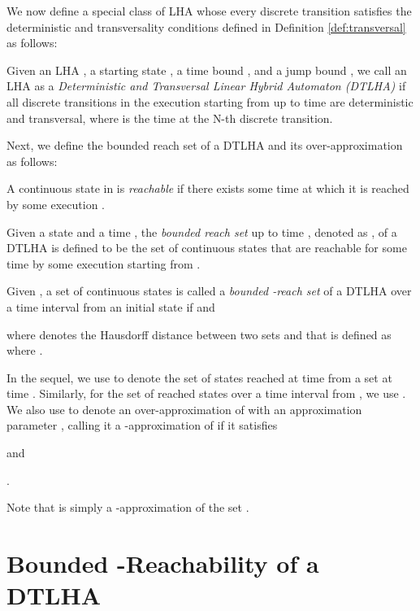 We now define a special class of LHA whose every discrete transition satisfies the deterministic and transversality conditions defined in Definition \ref{def:transversal} as follows:

\begin{defn} \label{pre:def:dtlha}
Given an LHA , a starting state , a time bound , and a jump bound , we call an LHA  as a \emph{Deterministic and Transversal Linear Hybrid Automaton (DTLHA)}  if all discrete transitions in the execution starting from  up to time  are deterministic and transversal, where  is the time at the N-th discrete transition.
\end{defn}


Next, we define the bounded reach set of a DTLHA and its over-approximation as follows:

\begin{defn}
A continuous state in  is \emph{reachable} if there exists some time  at which it is reached by some execution .
\end{defn}
\begin{defn} \label{def:pre:reach}
Given a state  and a time , the \emph{bounded reach set} up to time , denoted as , of a DTLHA  is defined to be the set of continuous states that are reachable for some time  by some execution  starting from .
\end{defn}
\begin{defn} \label{def:pre:ereach}
Given , a set of continuous states  is called a \emph{bounded -reach set} of a DTLHA  over a time interval  from an initial state  if  and

where  denotes the Hausdorff distance 
between two sets  and 
that is defined as  where .
\end{defn}


In the sequel, we use  to denote the set of states reached at time  from a set  at time .
Similarly, for the set of reached states over a time interval  from , we use .
We also use  to denote an over-approximation of  with an approximation parameter , calling it a -approximation of  if it satisfies 
\begin{inparaenum}[(i)]
\item  and
\item  .
\end{inparaenum}
Note that  is simply a -approximation of the set .



\section{Bounded -Reachability of a DTLHA} \label{sec:theory}

